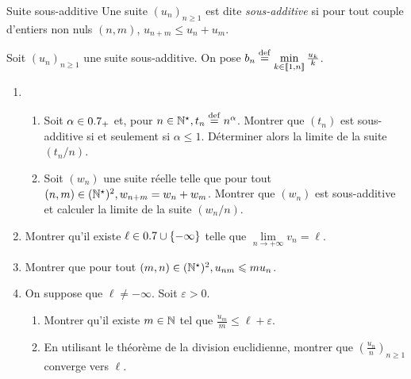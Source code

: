 \begin{defi}{Suite sous-additive}
    Une suite $(u_n)_{n\geqslant1}$ est dite \emph{sous-additive} si pour tout couple d'entiers non nuls $(n, m)$, $u_{n+m} \leqslant u_n + u_m$.
\end{defi}

\begin{exercice}
    Soit $(u_n)_{n \geqslant 1}$ une suite sous-additive. On pose $b_n \overset{\mathrm{\tiny def}}{=} \min\limits_{k \in \llbracket 1, n \rrbracket} \frac{u_k}{k}$.
    \begin{enumerate}
        \item \begin{enumerate}
            \item Soit $\alpha \in 0.7_+$ et, pour $n \in \mathbb{N}^\star, t_n \overset{\mathrm{\tiny def}}{=} n^{\alpha}$. Montrer que $(t_n)$ est sous-additive si et seulement si $\alpha \leqslant 1$. Déterminer alors la limite de la suite $(t_n/n)$.
            \item Soit $(w_n)$ une suite réelle telle que pour tout $(n,m) \in (\mathbb{N}^\star)^2, w_{n+m} = w_n + w_m$. Montrer que $(w_n)$ est sous-additive et calculer la limite de la suite $(w_n / n)$.
        \end{enumerate}
        \item Montrer qu'il existe $\ell \in 0.7 \cup \{ - \infty \}$ telle que $\lim\limits_{n \to +\infty} v_n = \ell$.
        \item Montrer que pour tout $(m,n) \in (\mathbb{N}^\star)^2, u_{nm} \leqslant m u_n$.
        \item On suppose que $\ell \not= - \infty$. Soit $\varepsilon > 0$.
        \begin{enumerate}
            \item Montrer qu'il existe $m \in \mathbb{N}$ tel que $\frac{u_m}{m} \leqslant \ell + \varepsilon$. 
            \item En utilisant le théorème de la division euclidienne, montrer que $\left( \frac{u_n}{n} \right)_{n \geqslant 1}$ converge vers $\ell$.
        \end{enumerate}
    \end{enumerate}
\end{exercice}


